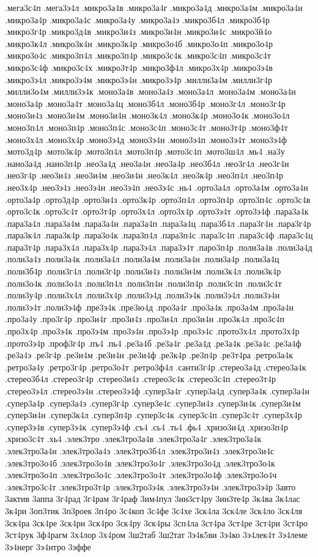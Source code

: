 {.мега3с4п
.мега3э4л
.микро3а4в
.микро3а4г
.микро3а4д
.микро3а4м
.микро3а4н
.микро3а4р
.микро3а4с
.микро3а4у
.микро3а4э
.микро3б4л
.микро3б4р
.микро3г4р
.микро3д4в
.микро3и4з
.микро3и4н
.микро3и4с
.микро3й4о
.микро3к4л
.микро3к4н
.микро3к4р
.микро3о4б
.микро3о4п
.микро3о4р
.микро3о4с
.микро3п4л
.микро3п4р
.микро3с4к
.микро3с4п
.микро3с4т
.микро3с4ф
.микро3с4х
.микро3т4р
.микро3ф4л
.микро3х4р
.микро3э4в
.микро3э4л
.микро3э4м
.микро3э4н
.микро3э4р
.милли3а4м
.милли3г4р
.милли3о4м
.милли3э4к
.моно3а4в
.моно3а4з
.моно3а4л
.моно3а4м
.моно3а4н
.моно3а4р
.моно3а4т
.моно3а4ц
.моно3б4л
.моно3б4р
.моно3г4л
.моно3г4р
.моно3и4з
.моно3и4м
.моно3и4н
.моно3к4л
.моно3к4р
.моно3о4к
.моно3о4л
.моно3п4л
.моно3п4р
.моно3п4с
.моно3с4п
.моно3с4т
.моно3т4р
.моно3ф4т
.моно3х4л
.моно3х4р
.моно3э4д
.моно3э4н
.моно3э4п
.моно3э4т
.моно3э4ф
.мото3д4р
.мото3к4р
.мото3п4л
.мото3п4р
.мото3с4п
.мото3ш4л
.мь4
.на3у
.нано3а4д
.нано3п4р
.нео3а4д
.нео3а4н
.нео3а4р
.нео3б4л
.нео3г4л
.нео3г4н
.нео3г4р
.нео3и4з
.нео3и4м
.нео3и4н
.нео3к4л
.нео3к4р
.нео3п4л
.нео3п4р
.нео3х4р
.нео3э4з
.нео3э4н
.нео3э4п
.нео3э4с
.нь4
.орто3а4л
.орто3а4м
.орто3а4н
.орто3а4р
.орто3д4р
.орто3и4з
.орто3к4р
.орто3п4л
.орто3п4р
.орто3п4с
.орто3с4в
.орто3с4к
.орто3с4т
.орто3т4р
.орто3х4л
.орто3х4р
.орто3э4т
.орто3э4ф
.пара3а4к
.пара3а4л
.пара3а4м
.пара3а4н
.пара3а4п
.пара3а4ц
.пара3б4л
.пара3г4н
.пара3г4р
.пара3к4л
.пара3к4р
.пара3о4к
.пара3п4л
.пара3п4с
.пара3с4п
.пара3с4ф
.пара3с4ц
.пара3т4р
.пара3х4л
.пара3х4р
.пара3э4л
.пара3э4т
.паро3п4р
.поли3а4в
.поли3а4д
.поли3а4з
.поли3а4к
.поли3а4л
.поли3а4м
.поли3а4н
.поли3а4р
.поли3а4ц
.поли3б4р
.поли3г4л
.поли3г4р
.поли3и4з
.поли3и4м
.поли3к4л
.поли3к4р
.поли3о4к
.поли3о4л
.поли3п4л
.поли3п4н
.поли3п4р
.поли3с4п
.поли3с4т
.поли3у4р
.поли3х4л
.поли3х4р
.поли3э4д
.поли3э4к
.поли3э4л
.поли3э4н
.поли3э4т
.поли3э4ф
.пре3э4к
.пре3ю4д
.про3а4г
.про3а4к
.про3а4м
.про3а4н
.про3а4у
.про3г4р
.про3и4г
.про3и4з
.про3и4л
.про3и4н
.про3к4л
.про3с4п
.про3х4р
.про3э4к
.про3э4м
.про3э4н
.про3э4р
.про3э4с
.прото3х4л
.прото3х4р
.прото3э4р
.проф3г4р
.пъ4
.пь4
.ре3а4б
.ре3а4г
.ре3а4д
.ре3а4к
.ре3а4с
.ре3а4ф
.ре3а4э
.ре3г4р
.ре3и4м
.ре3и4н
.ре3и4ф
.ре3к4р
.ре3п4р
.ре3т4ра
.ретро3а4к
.ретро3а4у
.ретро3г4р
.ретро3о4т
.ретро3ф4л
.санти3г4р
.стерео3а4д
.стерео3а4к
.стерео3б4л
.стерео3г4р
.стерео3и4з
.стерео3с4к
.стерео3с4п
.стерео3т4р
.стерео3э4л
.стерео3э4н
.стерео3э4ф
.супер3а4г
.супер3а4д
.супер3а4к
.супер3а4н
.супер3а4р
.супер3а4э
.супер3г4р
.супер3е4с
.супер3и4з
.супер3и4к
.супер3и4м
.супер3и4н
.супер3к4л
.супер3п4р
.супер3с4к
.супер3с4п
.супер3с4т
.супер3х4р
.супер3э4в
.супер3э4к
.супер3э4ф
.съ4
.сь4
.ть4
.фь4
.хризо3и4д
.хризо3п4р
.хризо3с4т
.хь4
.элек3тро
.элек3тро3а4в
.элек3тро3а4г
.элек3тро3а4к
.элек3тро3а4н
.элек3тро3а4э
.элек3тро3б4л
.элек3тро3и4з
.элек3тро3и4с
.элек3тро3о4б
.элек3тро3о4в
.элек3тро3о4г
.элек3тро3о4д
.элек3тро3о4к
.элек3тро3о4п
.элек3тро3о4с
.элек3тро3о4т
.элек3тро3о4ф
.элек3тро3о4ч
.элек3тро3с4т
.элек3тро3т4р
.элек3тро3э4к
.элек3тро3э4н
.элек3тро3э4р
3авто
3актив
3аппа
3г4рад
3г4рам
3г4раф
3им4пул
3ин3ст4ру
3ин3те4р
3к4ва
3к4лас
3к4ри
3оп3тик
3п3роек
3п4ро
3с4коп
3с4фе
3с4хе
3ск4ла
3ск4ле
3ск4ло
3ск4ля
3ск4ра
3ск4ре
3ск4ри
3ск4ро
3ск4ру
3ск4ры
3сп4ла
3ст4ра
3ст4ре
3ст4ри
3ст4ро
3ст4рук
3ф4рагм
3х4лор
3х4ром
3ш2таб
3ш2тат
3э4к5ви
3э4ко
3э4лек4т
3э4леме
3э4нерг
3э4нтро
3эффе
}

